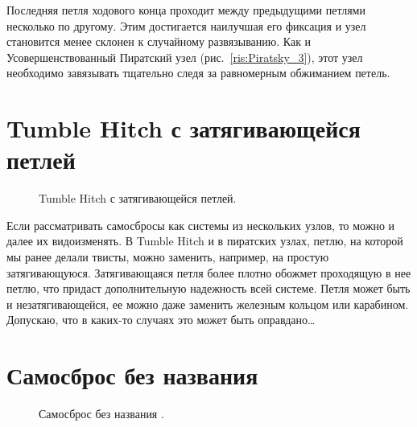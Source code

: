 \documentclass{artikel1}
\newcounter{SamosbrosNoName}\setcounter{SamosbrosNoName}{0}
\begin{document}
Последняя петля ходового конца проходит между предыдущими петлями несколько по другому. Этим достигается наилучшая его фиксация и узел становится менее склонен к случайному развязыванию. Как и Усовершенствованный Пиратский узел (рис.~\ref{ris:Piratsky_3}), этот узел необходимо завязывать тщательно следя за равномерным обжиманием петель.

\section{Tumble Hitch с затягивающейся петлей}

\begin{figure}[H]\centering
	\subfloat[Завязывание]{\label{ris:Samosbros_Simple_Noose_1}
	\tcbox[enhanced jigsaw,colframe=black,opacityframe=0.5,opacityback=0.5,height=6cm]
		{\centering
			}
		}
\hfill
	\subfloat[Завязывание]{\label{ris:Samosbros_Simple_Noose_2}
	\tcbox[enhanced jigsaw,colframe=black,opacityframe=0.5,opacityback=0.5,height=6cm]
		{\centering
			}
		}
\hfill
	\subfloat[Результат]{\label{ris:Samosbros_Simple_Noose_3}
	\tcbox[enhanced jigsaw,colframe=black,opacityframe=0.5,opacityback=0.5]
		{\centering
			}
		}
	\caption{Tumble Hitch с затягивающейся петлей.}\label{ris:Samosbros_Simple_Noose}
\end{figure}

Если рассматривать самосбросы как системы из нескольких узлов, то можно и далее их видоизменять. В Tumble Hitch и в пиратских узлах, петлю, на которой мы ранее делали твисты, можно заменить, например, на простую затягивающуюся. Затягивающаяся петля более плотно обожмет проходящую в нее петлю, что придаст дополнительную надежность всей системе. Петля может быть и незатягивающейся, ее можно даже заменить железным кольцом или карабином. Допускаю, что в каких-то случаях это может быть оправдано\dots

\addtocounter{SamosbrosNoName}{1}

\section{Самосброс без названия }

\begin{figure}[H]\centering
	\subfloat[Завязывание]{\label{ris:Piratsky_2_1}
	\tcbox[enhanced jigsaw,colframe=black,opacityframe=0.5,opacityback=0.5,height=7cm]
		{\centering
			}
		}
\hfill
	\subfloat[Результат]{\label{ris:Piratsky_2_2}
	\tcbox[enhanced jigsaw,colframe=black,opacityframe=0.5,opacityback=0.5,height=7cm]
		{\centering
			}
		}
	\caption{Самосброс без названия .}\label{ris:Piratsky_2}
\end{figure}
\end{document}
